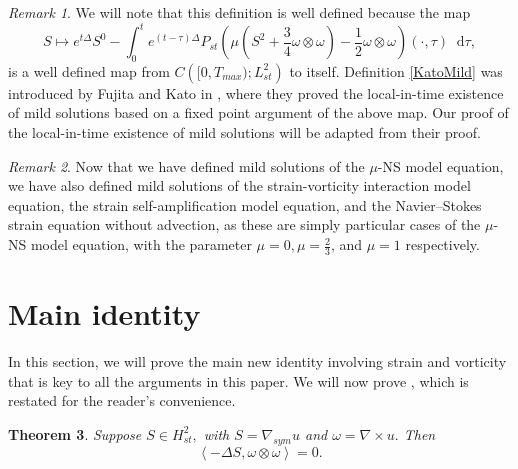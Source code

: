 \documentclass[11pt]{article}
\theoremstyle{plain}
\newtheorem{theorem}{Theorem}[section]
\theoremstyle{remark}
\newtheorem{remark}[theorem]{Remark}
\numberwithin{equation}{section}
\newcommand{\diff}{\mathop{}\!\mathrm{d}}
\begin{document}
\begin{remark}
We will note that this definition is well defined 
because the map
\begin{equation}
    S \longmapsto 
    e^{t\Delta}S^0
    -\int_0^t e^{(t-\tau)\Delta} 
    P_{st}\left(\mu\left(S^2
    +\frac{3}{4}\omega\otimes\omega\right)
    -\frac{1}{2}\omega\otimes\omega
    \right)(\cdot,\tau) \diff\tau,
\end{equation}
is a well defined map from
$C\left([0,T_{max});L^2_{st}\right)$ to itself.
Definition \ref{KatoMild} was introduced by Fujita and Kato in \cite{KatoFujita}, where they proved the local-in-time existence of mild solutions based on a fixed point argument of the above map. Our proof of the local-in-time existence of mild solutions will be adapted from their proof.
\end{remark}

\begin{remark}
Now that we have defined mild solutions of the $\mu$-NS model equation, we have also defined mild solutions of the strain-vorticity interaction model equation, the strain self-amplification model equation, and the Navier--Stokes strain equation without advection, as these are simply particular cases of the $\mu$-NS model equation, with the parameter $\mu=0, \mu=\frac{2}{3}$, and $\mu=1$ respectively.
\end{remark}



\section{Main identity} \label{MainID}

In this section, we will prove the main new identity involving strain and vorticity that is key to all the arguments in this paper.
We will now prove , which is restated for the reader's convenience.

\begin{theorem} \label{StrainVortOrthogonality}
Suppose $S\in H^2_{st},$ with $S=\nabla_{sym}u$ and $\omega =\nabla \times u.$ Then
\begin{equation}
    \left<-\Delta S, \omega \otimes \omega\right>=0.
\end{equation}
\end{theorem}
\end{document}
